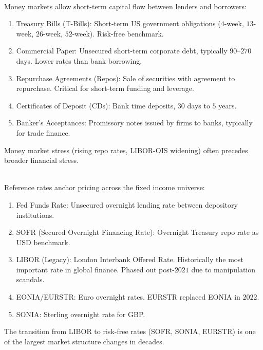 \begin{remark} \\
Money markets allow short-term capital flow between lenders and borrowers:
\begin{enumerate}[label=\roman*.]
\setlength{\itemsep}{0pt}
\item Treasury Bills (T-Bills): Short-term US government obligations ($4$-week, $13$-week, $26$-week, $52$-week). Risk-free benchmark.
\item Commercial Paper: Unsecured short-term corporate debt, typically $90$--$270$ days. Lower rates than bank borrowing.
\item Repurchase Agreements (Repos): Sale of securities with agreement to repurchase. Critical for short-term funding and leverage.
\item Certificates of Deposit (CDs): Bank time deposits, $30$ days to $5$ years.
\item Banker's Acceptances: Promissory notes issued by firms to banks, typically for trade finance.
\end{enumerate}
Money market stress (rising repo rates, LIBOR-OIS widening) often precedes broader financial stress.
\end{remark}

\begin{remark} \\
Reference rates anchor pricing across the fixed income universe:
\begin{enumerate}[label=\roman*.]
\setlength{\itemsep}{0pt}
\item Fed Funds Rate: Unsecured overnight lending rate between depository institutions.
\item SOFR (Secured Overnight Financing Rate): Overnight Treasury repo rate as USD benchmark.
\item LIBOR (Legacy): London Interbank Offered Rate. Historically the most important rate in global finance. Phased out post-$2021$ due to manipulation scandals.
\item EONIA/EURSTR: Euro overnight rates. EURSTR replaced EONIA in $2022$.
\item SONIA: Sterling overnight rate for GBP.
\end{enumerate}
The transition from LIBOR to risk-free rates (SOFR, SONIA, EURSTR) is one of the largest market structure changes in decades.
\end{remark}


